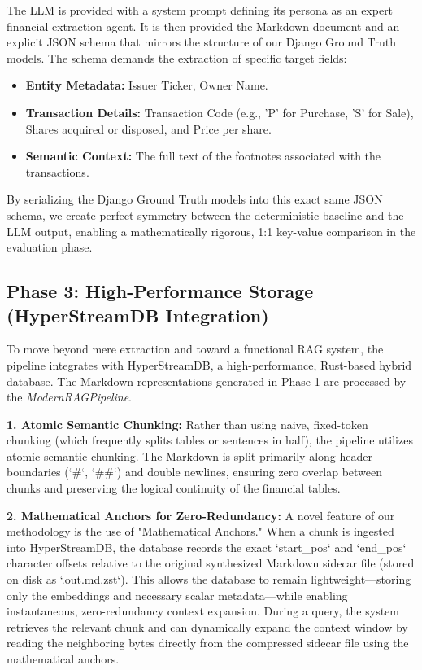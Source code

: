 \documentclass[journal, onecolumn]{IEEEtran}
\begin{document}
The LLM is provided with a system prompt defining its persona as an expert financial extraction agent. It is then provided the Markdown document and an explicit JSON schema that mirrors the structure of our Django Ground Truth models. The schema demands the extraction of specific target fields:
\begin{itemize}
    \item \textbf{Entity Metadata:} Issuer Ticker, Owner Name.
    \item \textbf{Transaction Details:} Transaction Code (e.g., 'P' for Purchase, 'S' for Sale), Shares acquired or disposed, and Price per share.
    \item \textbf{Semantic Context:} The full text of the footnotes associated with the transactions.
\end{itemize}
By serializing the Django Ground Truth models into this exact same JSON schema, we create perfect symmetry between the deterministic baseline and the LLM output, enabling a mathematically rigorous, 1:1 key-value comparison in the evaluation phase.

\subsection{Phase 3: High-Performance Storage (HyperStreamDB Integration)}
To move beyond mere extraction and toward a functional RAG system, the pipeline integrates with HyperStreamDB, a high-performance, Rust-based hybrid database. The Markdown representations generated in Phase 1 are processed by the \textit{ModernRAGPipeline}.

\textbf{1. Atomic Semantic Chunking:}
Rather than using naive, fixed-token chunking (which frequently splits tables or sentences in half), the pipeline utilizes atomic semantic chunking. The Markdown is split primarily along header boundaries (`\#`, `\#\#`) and double newlines, ensuring zero overlap between chunks and preserving the logical continuity of the financial tables.

\textbf{2. Mathematical Anchors for Zero-Redundancy:}
A novel feature of our methodology is the use of "Mathematical Anchors." When a chunk is ingested into HyperStreamDB, the database records the exact `start\_pos` and `end\_pos` character offsets relative to the original synthesized Markdown sidecar file (stored on disk as `.out.md.zst`). This allows the database to remain lightweight—storing only the embeddings and necessary scalar metadata—while enabling instantaneous, zero-redundancy context expansion. During a query, the system retrieves the relevant chunk and can dynamically expand the context window by reading the neighboring bytes directly from the compressed sidecar file using the mathematical anchors.
\end{document}
